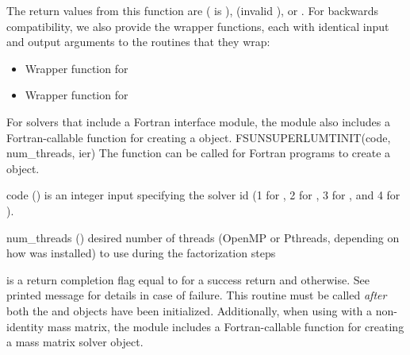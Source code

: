 {
  The return values from this function are 
  ( is ), 
  (invalid ), or .
}
{
}
For backwards compatibility, we also provide the wrapper functions,
each with identical input and output arguments to the routines that
they wrap:
\begin{itemize}

\item {}

  Wrapper function for 

\item {}

  Wrapper function for 

\end{itemize}
For solvers that include a Fortran interface module, the
{\sunlinsolslumt} module also includes a Fortran-callable function
for creating a  object.
{
  FSUNSUPERLUMTINIT(code, num\_threads, ier)
}
{
  The function  can be called for Fortran programs
  to create a {\sunlinsolklu} object.
}
{
  \begin{args}
  \item[code] ()
    is an integer input specifying the solver id (1 for {\cvode}, 2
    for {\ida}, 3 for {\kinsol}, and 4 for {\arkode}).
  \item[num\_threads] ()
    desired number of threads (OpenMP or Pthreads, depending on how
    {\superlumt} was installed) to use during the factorization steps
  \end{args}
}
{
   is a return completion flag equal to  for a success
  return and  otherwise. See printed message for details in case
  of failure.
}
{
  This routine must be
  called \emph{after} both the {\nvector} and {\sunmatrix} objects have
  been initialized.
}
Additionally, when using
{\arkode} with a non-identity mass matrix, the {\sunlinsolslumt} module
includes a Fortran-callable function for creating a
 mass matrix solver object.
